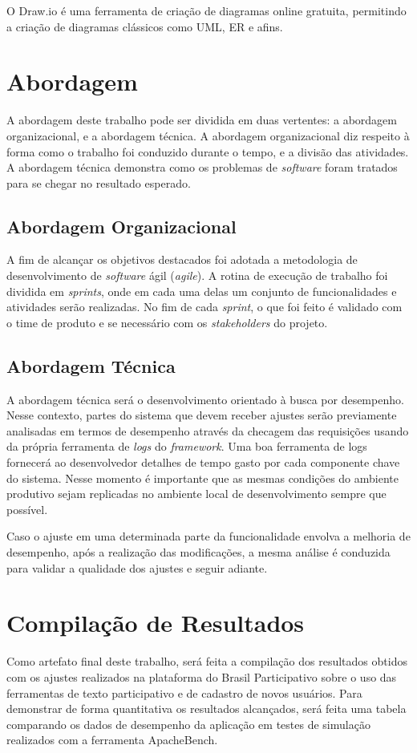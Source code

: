 O Draw.io é uma ferramenta de criação de diagramas online gratuita, permitindo a criação de diagramas clássicos como UML, ER e afins.

\section {Abordagem}

A abordagem deste trabalho pode ser dividida em duas vertentes: a abordagem organizacional, e a abordagem técnica. A abordagem organizacional diz respeito à forma como o trabalho foi conduzido durante o tempo, e a divisão das atividades. A abordagem técnica demonstra como os problemas de \textit{software} foram tratados para se chegar no resultado esperado.

\subsection {Abordagem Organizacional}

A fim de alcançar os objetivos destacados foi adotada a metodologia de desenvolvimento de \textit{software} ágil (\textit{agile}). A rotina de execução de trabalho foi dividida em \textit{sprints}, onde em cada uma delas um conjunto de funcionalidades e atividades serão realizadas. No fim de cada \textit{sprint}, o que foi feito é validado com o time de produto e se necessário com os \textit{stakeholders} do projeto.

\subsection {Abordagem Técnica}

A abordagem técnica será o desenvolvimento orientado à busca por desempenho. Nesse contexto, partes do sistema que devem receber ajustes serão previamente analisadas em termos de desempenho através da checagem das requisições usando da própria ferramenta de \textit{logs} do \textit{framework}. Uma boa ferramenta de logs fornecerá ao desenvolvedor detalhes de tempo gasto por cada componente chave do sistema. Nesse momento é importante que as mesmas condições do ambiente produtivo sejam replicadas no ambiente local de desenvolvimento sempre que possível.

Caso o ajuste em uma determinada parte da funcionalidade envolva a melhoria de desempenho, após a realização das modificações, a mesma análise é conduzida para validar a qualidade dos ajustes e seguir adiante.

\section {Compilação de Resultados}

Como artefato final deste trabalho, será feita a compilação dos resultados obtidos com os ajustes realizados na plataforma do Brasil Participativo sobre o uso das ferramentas de texto participativo e de cadastro de novos usuários. Para demonstrar de forma quantitativa os resultados alcançados, será feita uma tabela comparando os dados de desempenho da aplicação em testes de simulação realizados com a ferramenta ApacheBench.
